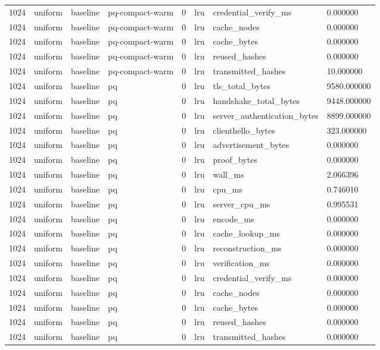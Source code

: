 \begin{tabular}{llllllll}
1024 & uniform & baseline & pq-compact-warm & 0 & lru & credential\_verify\_ms & 0.000000 \\
1024 & uniform & baseline & pq-compact-warm & 0 & lru & cache\_nodes & 0.000000 \\
1024 & uniform & baseline & pq-compact-warm & 0 & lru & cache\_bytes & 0.000000 \\
1024 & uniform & baseline & pq-compact-warm & 0 & lru & reused\_hashes & 0.000000 \\
1024 & uniform & baseline & pq-compact-warm & 0 & lru & transmitted\_hashes & 10.000000 \\
1024 & uniform & baseline & pq & 0 & lru & tls\_total\_bytes & 9580.000000 \\
1024 & uniform & baseline & pq & 0 & lru & handshake\_total\_bytes & 9448.000000 \\
1024 & uniform & baseline & pq & 0 & lru & server\_authentication\_bytes & 8899.000000 \\
1024 & uniform & baseline & pq & 0 & lru & clienthello\_bytes & 323.000000 \\
1024 & uniform & baseline & pq & 0 & lru & advertisement\_bytes & 0.000000 \\
1024 & uniform & baseline & pq & 0 & lru & proof\_bytes & 0.000000 \\
1024 & uniform & baseline & pq & 0 & lru & wall\_ms & 2.066396 \\
1024 & uniform & baseline & pq & 0 & lru & cpu\_ms & 0.746010 \\
1024 & uniform & baseline & pq & 0 & lru & server\_cpu\_ms & 0.995531 \\
1024 & uniform & baseline & pq & 0 & lru & encode\_ms & 0.000000 \\
1024 & uniform & baseline & pq & 0 & lru & cache\_lookup\_ms & 0.000000 \\
1024 & uniform & baseline & pq & 0 & lru & reconstruction\_ms & 0.000000 \\
1024 & uniform & baseline & pq & 0 & lru & verification\_ms & 0.000000 \\
1024 & uniform & baseline & pq & 0 & lru & credential\_verify\_ms & 0.000000 \\
1024 & uniform & baseline & pq & 0 & lru & cache\_nodes & 0.000000 \\
1024 & uniform & baseline & pq & 0 & lru & cache\_bytes & 0.000000 \\
1024 & uniform & baseline & pq & 0 & lru & reused\_hashes & 0.000000 \\
1024 & uniform & baseline & pq & 0 & lru & transmitted\_hashes & 0.000000 \\

\end{tabular}
